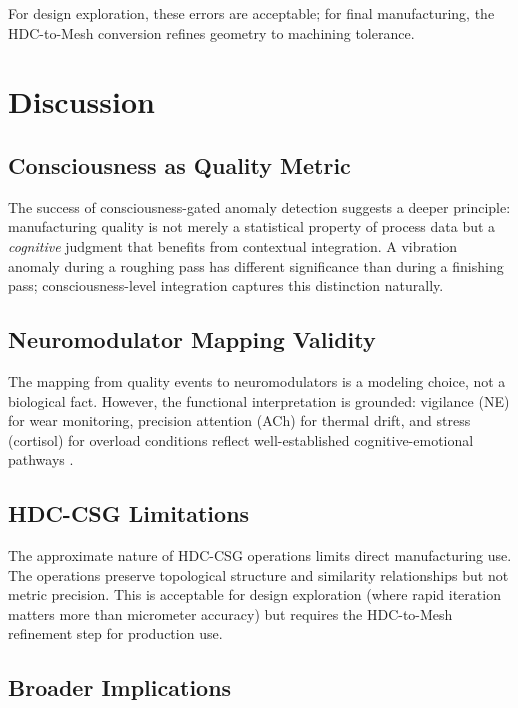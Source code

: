 \documentclass[11pt,a4paper]{article}
\begin{document}
For design exploration, these errors are acceptable; for final manufacturing, the HDC-to-Mesh conversion refines geometry to machining tolerance.

\section{Discussion}

\subsection{Consciousness as Quality Metric}

The success of consciousness-gated anomaly detection suggests a deeper principle: manufacturing quality is not merely a statistical property of process data but a \emph{cognitive} judgment that benefits from contextual integration. A vibration anomaly during a roughing pass has different significance than during a finishing pass; consciousness-level integration captures this distinction naturally.

\subsection{Neuromodulator Mapping Validity}

The mapping from quality events to neuromodulators is a modeling choice, not a biological fact. However, the functional interpretation is grounded: vigilance (NE) for wear monitoring, precision attention (ACh) for thermal drift, and stress (cortisol) for overload conditions reflect well-established cognitive-emotional pathways \citep{robbins2007}.

\subsection{HDC-CSG Limitations}

The approximate nature of HDC-CSG operations limits direct manufacturing use. The operations preserve topological structure and similarity relationships but not metric precision. This is acceptable for design exploration (where rapid iteration matters more than micrometer accuracy) but requires the HDC-to-Mesh refinement step for production use.

\subsection{Broader Implications}
\end{document}
